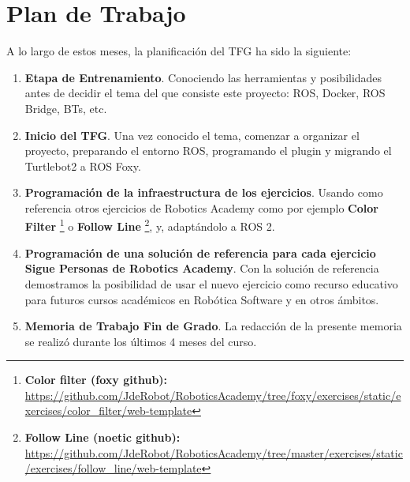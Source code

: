 \section{Plan de Trabajo}
\label{sec:plan_trabajo}
A lo largo de estos meses, la planificación del TFG ha sido la siguiente:

\begin{enumerate}
	\item \textbf{Etapa de Entrenamiento}. Conociendo las herramientas y posibilidades antes de decidir el tema del que consiste este proyecto: ROS, Docker, ROS Bridge, BTs, etc.
	\item \textbf{Inicio del TFG}. Una vez conocido el tema, comenzar a organizar el proyecto, preparando el entorno ROS, programando el plugin y migrando el Turtlebot2 a ROS Foxy.
	\item \textbf{Programación de la infraestructura de los ejercicios}. Usando como referencia otros ejercicios de Robotics Academy como por ejemplo \textbf{Color Filter} \footnote{\textbf{Color filter (foxy github):} \url{https://github.com/JdeRobot/RoboticsAcademy/tree/foxy/exercises/static/exercises/color_filter/web-template}} o \textbf{Follow Line} \footnote{\textbf{Follow Line (noetic github):} \url{https://github.com/JdeRobot/RoboticsAcademy/tree/master/exercises/static/exercises/follow_line/web-template}}, y, adaptándolo a ROS 2.
	\item \textbf{Programación de una solución de referencia para cada ejercicio Sigue Personas de Robotics Academy}. Con la solución de referencia demostramos la posibilidad de usar el nuevo ejercicio como recurso educativo para futuros cursos académicos en Robótica Software y en otros ámbitos.
	\item \textbf{Memoria de Trabajo Fin de Grado}. La redacción de la presente memoria se realizó durante los últimos 4 meses del curso. 
\end{enumerate}


